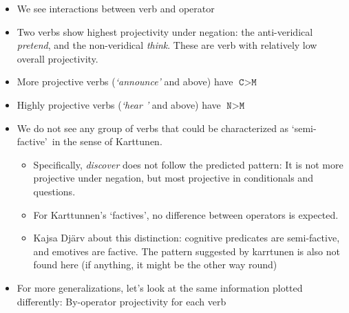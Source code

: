 \documentclass[10pt]{article}\usepackage[]{graphicx}\usepackage[dvipsnames]{xcolor}
\begin{document}
\begin{itemize}
  \item We see interactions between verb and operator

  \item Two verbs show highest projectivity under negation: the anti-veridical \emph{pretend}, and the non-veridical \emph{think}. These are verb with relatively low overall projectivity.

  \item More projective verbs (\emph{\lq announce\rq} and above) have $\texttt{C} > \texttt{M}$

  \item Highly projective verbs (\emph{\lq hear \rq} and above) have  $\texttt{N} > \texttt{M}$

  \item We do not see any group of verbs that could be characterized as \lq semi-factive\rq\ in the sense of Karttunen.
  \begin{itemize}
    \item Specifically, \emph{discover} does not follow the predicted pattern: It is not more projective under negation, but most projective in conditionals and questions.
    \item For Karttunnen's \lq factives\rq, no difference between operators is expected.
    \item Kajsa Djärv about this distinction: cognitive predicates are semi-factive, and emotives are factive. The pattern suggested by karrtunen is also not found here (if anything, it might be the other way round)
  \end{itemize}

  \item For more generalizations, let's look at the same information plotted differently: By-operator projectivity for each verb
\end{itemize}
\end{document}
